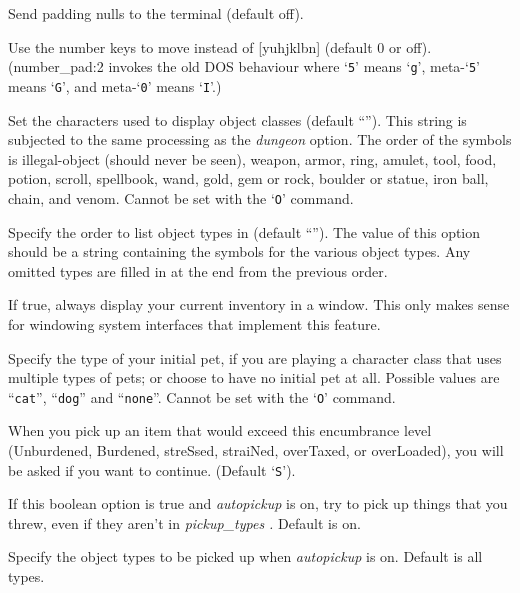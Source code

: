 \item[\ib{null}]
Send padding nulls to the terminal (default off).

\item[\ib{number\_pad}]
Use the number keys to move instead of [yuhjklbn] (default 0 or off).
(number\_pad:2 invokes the old DOS behaviour where `{\tt 5}' means `{\tt g}', meta-`{\tt 5}'
means `{\tt G}',  and meta-`{\tt 0}' means `{\tt I}'.)

\item[\ib{objects}]
Set the characters used to display object classes
(default ``\Symbol{])[="(\%!?+/\$*`0\_.}'').
This string is subjected to the same processing as the
{\it dungeon\/} 
option.
The order of the symbols is
illegal-object (should never be seen), weapon, armor, ring, amulet, tool,
food, potion, scroll, spellbook, wand, gold, gem or rock, boulder or statue,
iron ball, chain, and venom.
Cannot be set with the `{\tt O}' command.

\item[\ib{packorder}]
Specify the order to list object types in (default ``\Symbol{")[\%?+!=/(*`0\_}'').
The value of this option should be a string containing the
symbols for the various object types.  Any omitted types are filled in
at the end from the previous order.

\item[\ib{perm\_invent}]
If true, always display your current inventory in a window.  This only
makes sense for windowing system interfaces that implement this feature.

\item[\ib{pettype}]
Specify the type of your initial pet, if you are playing a character class
that uses multiple types of pets; or choose to have no initial pet at all.
Possible values are ``{\tt cat}'', ``{\tt dog}'' and ``{\tt none}''.
Cannot be set with the `{\tt O}' command.

\item[\ib{pickup\_burden}]
When you pick up an item that would exceed this encumbrance
level (Unburdened, Burdened, streSsed, straiNed, overTaxed,
or overLoaded), you will be asked if you want to continue.
(Default `{\tt S}').

\item[\ib{pickup\_thrown}]
If this boolean option is true and
{\it autopickup\/} 
is on, try to pick up things that you threw, even if they aren't in
{\it pickup_types .\/} 
Default is on.

\item[\ib{pickup\_types}]
Specify the object types to be picked up when
{\it autopickup\/} 
is on.  Default is all types.

